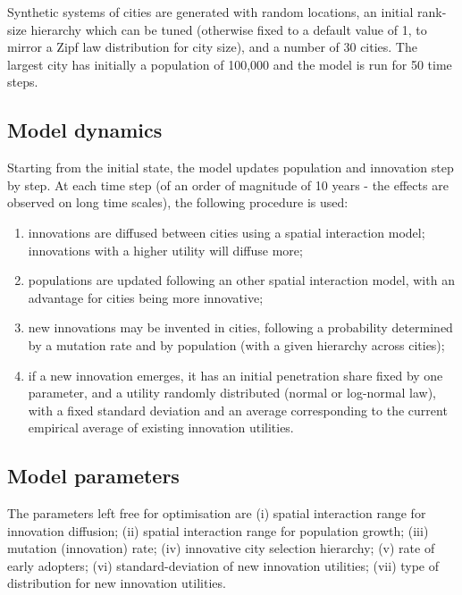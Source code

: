 \documentclass{article}
\begin{document}
Synthetic systems of cities are generated with random locations, an initial rank-size hierarchy which can be tuned (otherwise fixed to a default value of 1, to mirror a Zipf law distribution for city size), and a number of 30 cities. The largest city has initially a population of 100,000 and the model is run for 50 time steps. 


\subsection{Model dynamics}

Starting from the initial state, the model updates population and innovation step by step. At each time step (of an order of magnitude of 10 years - the effects are observed on long time scales), the following procedure is used:

\begin{enumerate}
	\item innovations are diffused between cities using a spatial interaction model; innovations with a higher utility will diffuse more;
	\item populations are updated following an other spatial interaction model, with an advantage for cities being more innovative;
	\item new innovations may be invented in cities, following a probability determined by a mutation rate and by population (with a given hierarchy across cities);
	\item if a new innovation emerges, it has an initial penetration share fixed by one parameter, and a utility randomly distributed (normal or log-normal law), with a fixed standard deviation and an average corresponding to the current empirical average of existing innovation utilities.
\end{enumerate}



\subsection{Model parameters}

The parameters left free for optimisation are (i) spatial interaction range for innovation diffusion; (ii) spatial interaction range for population growth; (iii) mutation (innovation) rate; (iv) innovative city selection hierarchy; (v) rate of early adopters; (vi) standard-deviation of new innovation utilities; (vii) type of distribution for new innovation utilities.
\end{document}

